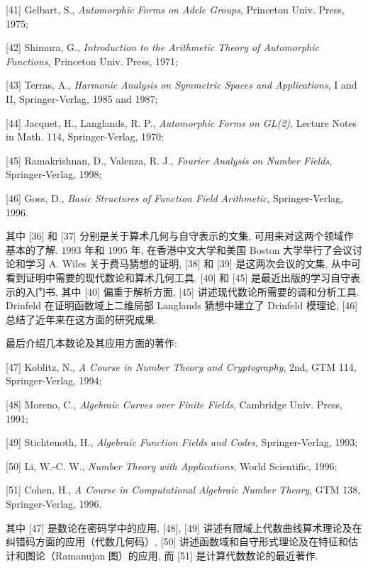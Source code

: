 [41] Gelbart, S., \emph{Automorphic Forms on Adele Groups}, Princeton Univ. Press, 1975;

[42] Shimura, G., \emph{Introduction to the Arithmetic Theory of Automorphic Functions}, Princeton Univ. Press, 1971;

[43] Terras, A., \emph{Harmonic Analysis on Symmetric Spaces and Applications}, I and II, Springer-Verlag, 1985 and 1987;

[44] Jacquet, H., Langlands, R. P., \emph{Automorphic Forms on GL(2)}, Lecture Notes in Math. 114, Springer-Verlag, 1970;

[45] Ramakrishnan, D., Valenza, R. J., \emph{Fourier Analysis on Number Fields}, Springer-Verlag, 1998;

[46] Goss, D., \emph{Basic Structures of Function Field Arithmetic}, Springer-Verlag, 1996.

其中 [36] 和 [37] 分别是关于算术几何与自守表示的文集, 可用来对这两个领域作基本的了解. $1993$ 年和 $1995$ 年, 在香港中文大学和美国 Boston 大学举行了会议讨论和学习 A. Wiles 关于费马猜想的证明, [38] 和 [39] 是这两次会议的文集, 从中可看到证明中需要的现代数论和算术几何工具. [40] 和 [45] 是最近出版的学习自守表示的入门书, 其中 [40] 偏重于解析方面, [45] 讲述现代数论所需要的调和分析工具. Drinfeld 在证明函数域上二维局部 Langlands 猜想中建立了 Drinfeld 模理论, [46] 总结了近年来在这方面的研究成果.

最后介绍几本数论及其应用方面的著作:

[47] Koblitz, N., \emph{A Course in Number Theory and Cryptography}, 2nd, GTM 114, Springer-Verlag, 1994;

[48] Moreno, C., \emph{Algebraic Curves over Finite Fields}, Cambridge Univ. Press, 1991;

[49] Stichtenoth, H., \emph{Algebraic Function Fields and Codes}, Springer-Verlag, 1993;

[50] Li, W.-C. W., \emph{Number Theory with Applications}, World Scientific, 1996;

[51] Cohen, H., \emph{A Course in Computational Algebraic Number Theory}, GTM 138, Springer-Verlag, 1996.

其中 [47] 是数论在密码学中的应用, [48], [49] 讲述有限域上代数曲线算术理论及在纠错码方面的应用（代数几何码）, [50] 讲述函数域和自守形式理论及在特征和估计和图论（Ramanujan 图）的应用, 而 [51] 是计算代数数论的最近著作.
